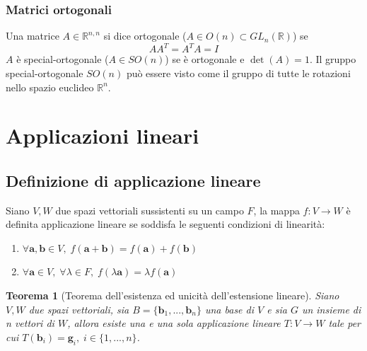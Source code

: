 \documentclass{article}
\newtheorem{theorem}{Teorema}
\begin{document}
    \subsubsection{Matrici ortogonali} \label{subsubsec:matorthogonal}
    Una matrice $A \in \mathbb{R}^{n, n}$ si dice ortogonale ($A \in O(n) \subset GL_{n}(\mathbb{R})$) se 
    \[
        AA^{T} = A^{T}A = I
    \]
    $A$ è special-ortogonale ($A \in SO(n)$) se è ortogonale e $\det(A) = 1$.
    Il gruppo special-ortogonale $SO(n)$ può essere visto come il gruppo di tutte le rotazioni nello spazio euclideo $\mathbb{R}^{n}$.




    

\newpage
\section{Applicazioni lineari} \label{sec:linapp}
\subsection{Definizione di applicazione lineare} \label{subsec:linappdef}
    Siano $V, W$ due spazi vettoriali sussistenti su un campo $F$, la mappa $f: V \rightarrow W$ è definita applicazione lineare se soddisfa le seguenti condizioni di linearità:
    \begin{enumerate}[label=(\arabic*)]
        \item $\forall \mathbf{a}, \mathbf{b} \in V, \; f(\mathbf{a} + \mathbf{b}) = f(\mathbf{a}) + f(\mathbf{b})$ 
        \item $\forall \mathbf{a} \in V, \; \forall \lambda \in F, \; f(\lambda \mathbf{a}) = \lambda f(\mathbf{a})$ 
    \end{enumerate}

    \vspace{10pt}
    \begin{theorem}[Teorema dell'esistenza ed unicità dell'estensione lineare]
       Siano $V, W$ due spazi vettoriali, sia $B = \{\mathbf{b}_{1}, ..., \mathbf{b}_{n}\}$ una base di $V$ e sia $G$ un insieme di n vettori di $W$, allora esiste una e una sola
       applicazione lineare $T : V \rightarrow W$ tale per cui $T(\mathbf{b}_{i}) = \mathbf{g}_{i}, \; i \in \{1, ..., n\}$.
    \end{theorem}
\end{document}
